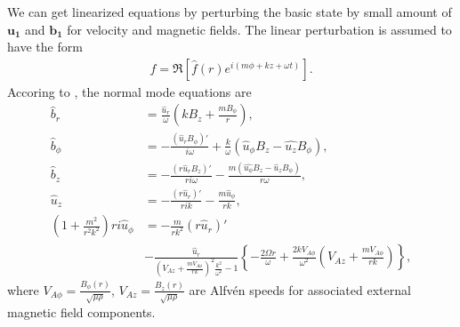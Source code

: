 \documentclass{jfm}
\newcommand{\del}{\nabla}
\begin{document}
We can get linearized equations by perturbing the basic state by small amount
of $\mathbf{u_1}$ and $\mathbf{b_1}$ for velocity and magnetic fields.
The linear perturbation is assumed to have the form
\begin{align}
    f=\Re\left[\hat{f}(r)e^{i(m\phi+kz+\omega t)} \right].
\end{align}
Accoring to \cite{Acheson1972}, the normal mode equations are
\begin{align}
\hat{b}_r &=\frac{\hat{u}_r}{\omega}\left(k B_z +\frac{m B_\phi}{r}\right),\\
\hat{b}_\phi &= -\frac{(\hat{u}_r B_\phi)'}{i\omega} +\frac{k}{\omega}(\hat{u}_\phi B_z -\hat{u_z}B_\phi),\\
\hat{b}_z &= -\frac{(r\hat{u}_r B_z)'}{ri\omega} - \frac{m(\hat{u_\phi} B_z - \hat{u}_z B_\phi)}{r\omega},\\
\hat{u}_z &= -\frac{(r\hat{u}_r)'}{rik}-\frac{m\hat{u}_\phi}{rk},\\
\left(1+\frac{m^2}{r^2k^2}\right)ri\hat{u}_\phi &= -\frac{m}{rk^2}(r\hat{u}_r)' \nonumber \\ &-\frac{\hat{u}_r}{\left(V_{Az}+\frac{m V_{A\phi}}{rk}\right)^2\frac{k^2}{\omega^2}-1}
\left\{-\frac{2\Omega r}{\omega}+\frac{2kV_{A\phi}}{\omega^2}\left(V_{Az}+\frac{mV_{A\phi}}{rk}\right)\right\},
\end{align}
where $V_{A\phi}=\frac{B_\phi (r)}{\sqrt{\mu\rho}}$, $V_{Az}=\frac{B_z (r)}{\sqrt{\mu\rho}}$ are Alfv\'en speeds for associated external magnetic field components.
\end{document}
